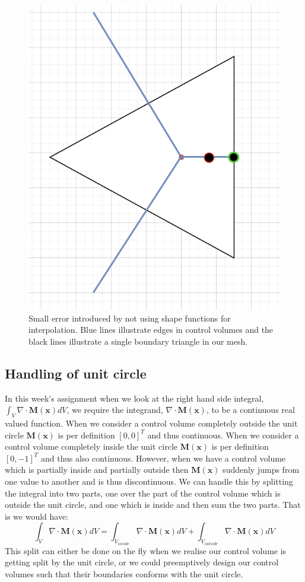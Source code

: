 \begin{figure}
	\centering
	\includegraphics[width=0.5\linewidth]{Materials/boundary}
	\caption{Small error introduced by not using shape functions for interpolation. Blue lines illustrate edges in control volumes and the black lines illustrate a single boundary triangle in our mesh.}
	\label{boundary}
\end{figure}

\subsection{Handling of unit circle}
In this week's assignment when we look at the right hand side integral, $\int_V \nabla \cdot \mathbf{M}(\mathbf{x})dV$, we require the integrand, $\nabla \cdot \mathbf{M}(\mathbf{x})$, to be a continuous real valued function. When we consider a control volume completely outside the unit circle $\mathbf{M}(\mathbf{x})$ is per definition $[0,0]^T$ and thus continuous. When we consider a control volume completely inside the unit circle $\mathbf{M}(\mathbf{x})$ is per definition $[0,-1]^T$ and thus also continuous. However, when we have a control volume which is partially inside and partially outside then $\mathbf{M}(\mathbf{x})$ suddenly jumps from one value to another and is thus discontinuous. We can handle this by splitting the integral into two parts, one over the part of the control volume which is outside the unit circle, and one which is inside and then sum the two parts. That is we would have:
\begin{equation*}
	\int_V \nabla \cdot \mathbf{M}(\mathbf{x})dV = \int_{V_{inside}} \nabla \cdot \mathbf{M}(\mathbf{x})dV + \int_{V_{outside}} \nabla \cdot \mathbf{M}(\mathbf{x})dV
\end{equation*}
This split can either be done on the fly when we realise our control volume is getting split by the unit circle, or we could preemptively design our control volumes such that their boundaries conforms with the unit circle.
